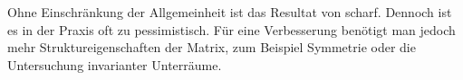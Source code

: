 \begin{remark}
  Ohne Einschränkung der Allgemeinheit ist das Resultat von
   scharf. Dennoch ist es in der Praxis
  oft zu pessimistisch. Für eine Verbesserung benötigt man jedoch mehr
  Struktureigenschaften der Matrix, zum Beispiel Symmetrie oder die
  Untersuchung invarianter Unterräume.
\end{remark}



